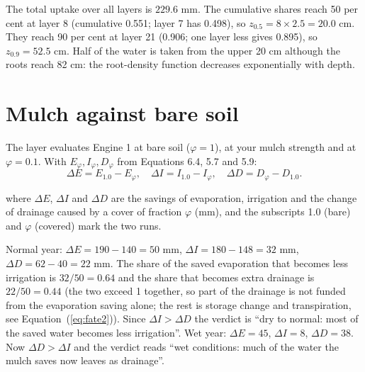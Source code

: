 \sol  The total uptake over all layers is $229.6$ mm. The cumulative shares reach 50 per cent at layer 8 (cumulative 0.551; layer 7 has 0.498), so $z_{0.5}=8\times2.5=20.0$ cm. They reach 90 per cent at layer 21 (0.906; one layer less gives 0.895), so $z_{0.9}=52.5$ cm. Half of the water is taken from the upper 20 cm although the roots reach 82 cm: the root-density function decreases exponentially with depth.
\label{ch:mulch}
\section{Mulch against bare soil}
The layer evaluates Engine 1 at bare soil ($\varphi=1$), at your mulch strength and at $\varphi=0.1$. With $E_\varphi,I_\varphi,D_\varphi$ from Equations 6.4, 5.7 and 5.9:
\begin{equation}\boxed{\Delta E=E_{1.0}-E_\varphi,\quad\Delta I=I_{1.0}-I_\varphi,\quad\Delta D=D_\varphi-D_{1.0}.}\end{equation}
\par\noindent where $\Delta E$, $\Delta I$ and $\Delta D$ are the savings of evaporation, irrigation and the change of drainage caused by a cover of fraction $\varphi$ (mm), and the subscripts 1.0 (bare) and $\varphi$ (covered) mark the two runs. \finans


\sol {}\ans Normal year: $\Delta E=190-140=50$ mm, $\Delta I=180-148=32$ mm, $\Delta D=62-40=22$ mm. The share of the saved evaporation that becomes less irrigation is $32/50=0.64$ and the share that becomes extra drainage is $22/50=0.44$ (the two exceed 1 together, so part of the drainage is not funded from the evaporation saving alone; the rest is storage change and transpiration, see Equation~(\ref{eq:fate2})). Since $\Delta I>\Delta D$ the verdict is ``dry to normal: most of the saved water becomes less irrigation''. Wet year: $\Delta E=45$, $\Delta I=8$, $\Delta D=38$. Now $\Delta D>\Delta I$ and the verdict reads ``wet conditions: much of the water the mulch saves now leaves as drainage''. \finans


